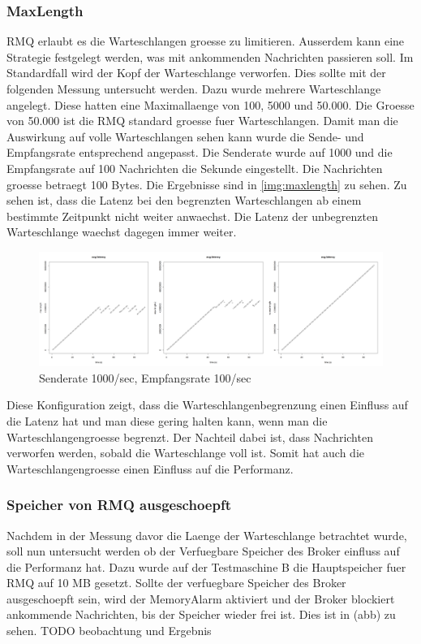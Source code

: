 \subsubsection{MaxLength}
\label{subsub:maxlength}
RMQ erlaubt es die Warteschlangen groesse zu limitieren. Ausserdem kann eine Strategie festgelegt werden, was mit ankommenden Nachrichten passieren soll. Im Standardfall wird der Kopf der Warteschlange verworfen. Dies sollte mit der folgenden Messung untersucht werden. Dazu wurde mehrere Warteschlange angelegt. Diese hatten eine Maximallaenge von 100, 5000 und 50.000. Die Groesse von 50.000 ist die RMQ standard groesse fuer Warteschlangen. Damit man die Auswirkung auf volle Warteschlangen sehen kann wurde die Sende- und Empfangsrate entsprechend angepasst. Die Senderate wurde auf 1000 und die Empfangsrate auf 100 Nachrichten die Sekunde eingestellt. Die Nachrichten groesse betraegt 100 Bytes.
Die Ergebnisse sind in \autoref{img:maxlength} zu sehen. Zu sehen ist, dass die Latenz bei den begrenzten Warteschlangen ab einem bestimmte Zeitpunkt nicht weiter anwaechst. Die Latenz der unbegrenzten Warteschlange waechst dagegen immer weiter.
\begin{figure}
\center
  \includegraphics[width=1\textwidth]{images/measurement/max-length.png}
  \caption{Senderate 1000/sec, Empfangsrate 100/sec}
  \label{img:maxlength}
\end{figure}
Diese Konfiguration zeigt, dass die Warteschlangenbegrenzung einen Einfluss auf die Latenz hat und man diese gering halten kann, wenn man die Warteschlangengroesse begrenzt. Der Nachteil dabei ist, dass Nachrichten verworfen werden, sobald die Warteschlange voll ist. Somit hat auch die Warteschlangengroesse einen Einfluss auf die Performanz. 



\subsubsection{Speicher von RMQ ausgeschoepft}
Nachdem in der Messung davor die Laenge der Warteschlange betrachtet wurde, soll nun untersucht werden ob der Verfuegbare Speicher des Broker einfluss auf die Performanz hat. Dazu wurde auf der Testmaschine B die Hauptspeicher fuer RMQ auf 10 MB gesetzt.  
Sollte der verfuegbare Speicher des Broker ausgeschoepft sein, wird der MemoryAlarm aktiviert und der Broker blockiert ankommende Nachrichten, bis der Speicher wieder frei ist. Dies ist in (abb) zu sehen.
TODO beobachtung und Ergebnis

